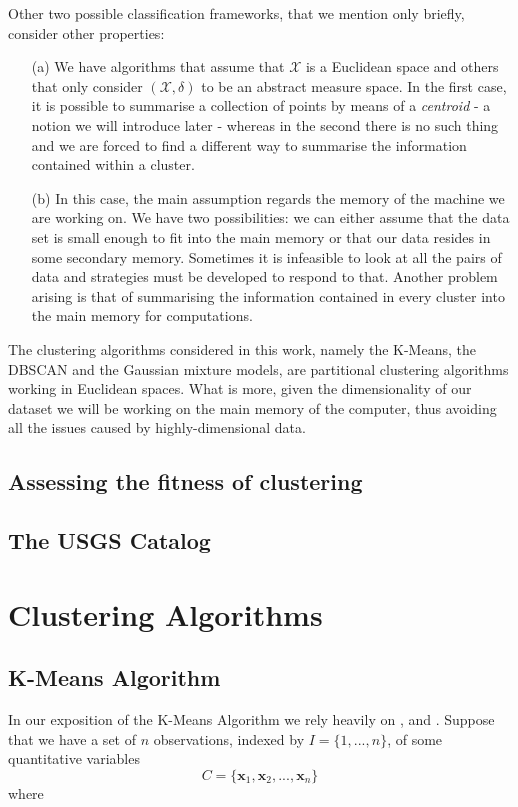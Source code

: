 \documentclass[a4paper]{article}
\begin{document}
	Other two possible classification frameworks, that we mention only briefly, consider other properties:
	\begin{enumerate}
		\item[(a)] We have algorithms that assume that $\mathcal{X}$ is a Euclidean space and others that only consider $\left( \mathcal{X}, \delta \right)$ to be an abstract measure space. In the first case, it is possible to summarise a collection of points by means of a \textit{centroid} - a notion we will introduce later - whereas in the second there is no such thing and we are forced to find a different way to summarise the information contained within a cluster.
		\item[(b)] In this case, the main assumption regards the memory of the machine we are working on. We have two possibilities: we can either assume that the data set is small enough to fit into the main memory or that our data resides in some secondary memory. Sometimes it is infeasible to look at all the pairs of data and strategies must be developed to respond to that. Another problem arising is that of summarising the information contained in every cluster into the main memory for computations.
	\end{enumerate}

	The clustering algorithms considered in this work, namely the K-Means, the DBSCAN and the Gaussian mixture models, are partitional clustering algorithms working in Euclidean spaces. What is more, given the dimensionality of our dataset we will be working on the main memory of the computer, thus avoiding all the issues caused by highly-dimensional data.
	\subsection{Assessing the fitness of clustering}
	
	\subsection{The USGS Catalog}
	\section{Clustering Algorithms}
	\subsection{K-Means Algorithm}
	In our exposition of the K-Means Algorithm we rely heavily on \cite{hastie01statisticallearning}, \cite{MR2372475} and \cite{zaki2014dataminingbook}.
	Suppose that we have a set of $n$ observations, indexed by $I = \{1, ..., n\}$, of some quantitative
	variables
	$$ C = \{ \boldsymbol{x}_{1}, \boldsymbol{x}_{2}, ..., \boldsymbol{x}_{n} \} $$
	where
	
\end{document}
